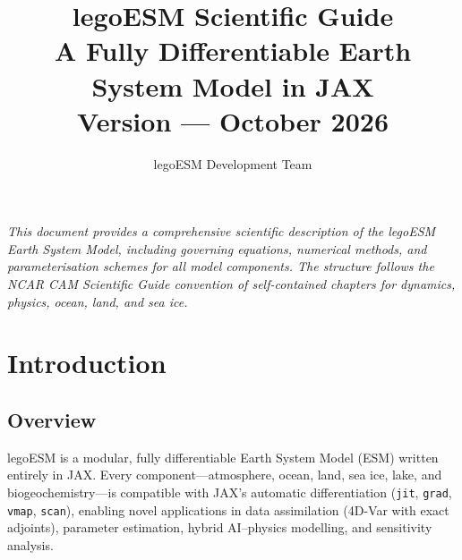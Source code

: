 \documentclass[11pt,twoside]{report}
\title{
  \vspace{-1cm}
  \textbf{legoESM \legoesmversion{} Scientific Guide}\\[6pt]
  {\Large A Fully Differentiable Earth System Model in JAX}\\[6pt]
  {\large Version \legoesmversion{} --- October 2026}
}
\author{legoESM Development Team}
\date{}
\begin{document}
\maketitle
\thispagestyle{empty}

\vfill
\noindent\textit{This document provides a comprehensive scientific description of the
legoESM Earth System Model, including governing equations, numerical methods,
and parameterisation schemes for all model components.  The structure follows
the NCAR CAM Scientific Guide convention of self-contained chapters for
dynamics, physics, ocean, land, and sea ice.}

\newpage
\tableofcontents
\newpage

\chapter{Introduction}
\label{ch:intro}

\section{Overview}

legoESM is a modular, fully differentiable Earth System Model (ESM) written
entirely in JAX.  Every component---atmosphere, ocean, land, sea ice, lake,
and biogeochemistry---is compatible with JAX's automatic differentiation
(\texttt{jit}, \texttt{grad}, \texttt{vmap}, \texttt{scan}), enabling novel
applications in data assimilation (4D-Var with exact adjoints), parameter
estimation, hybrid AI--physics modelling, and sensitivity analysis.
\end{document}
